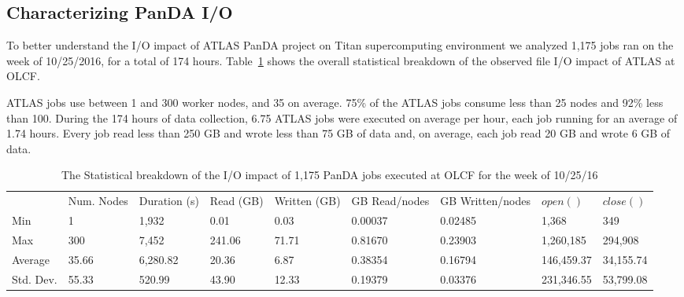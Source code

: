 

\subsection{Characterizing PanDA I/O}

To better understand the I/O impact of ATLAS PanDA project on Titan
supercomputing environment we analyzed 1,175 jobs ran on the week of 10/25/2016,
for a total of 174 hours. Table~\ref{panda-olcf-stats} shows the overall
statistical breakdown of the observed file I/O impact of ATLAS at OLCF\@.
%

ATLAS jobs use between 1 and 300 worker nodes, and 35 on average. 75\% of the
ATLAS jobs consume less than 25 nodes and 92\% less than 100. During the 174
hours of data collection, 6.75 ATLAS jobs were executed on average per hour,
each job running for an average of 1.74 hours.
Every job read less than 250 GB and wrote less than 75 GB of data and, on
average, each job read 20 GB and wrote 6 GB of data.

\begin{table}[t]
\centering
\begin{tabular}{lllllllll}
 & Num. Nodes & Duration (s) & Read (GB) & Written (GB) & GB Read/nodes & GB Written/nodes & $open()$ & $close()$ \\
Min & 1 & 1,932 & 0.01 & 0.03 & 0.00037 & 0.02485 & 1,368 & 349 \\
Max & 300 & 7,452 & 241.06 & 71.71 & 0.81670 & 0.23903 & 1,260,185 & 294,908 \\
Average & 35.66 & 6,280.82 & 20.36 & 6.87 & 0.38354 & 0.16794 & 146,459.37 & 34,155.74 \\
Std. Dev. & 55.33 & 520.99 & 43.90 & 12.33 & 0.19379 & 0.03376 & 231,346.55 & 53,799.08
\end{tabular}
\caption{The Statistical breakdown of the I/O impact of 1,175 PanDA jobs executed at OLCF for the week of 10/25/16}
\label{panda-olcf-stats}
\end{table}


